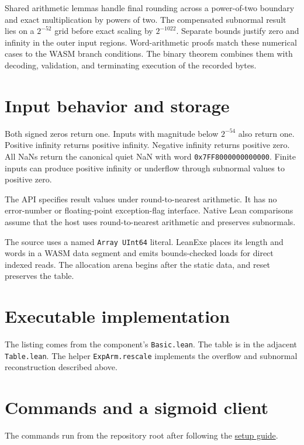Shared arithmetic lemmas handle final rounding across a power-of-two
boundary and exact multiplication by powers of two.  The compensated
subnormal result lies on a $2^{-52}$ grid before exact scaling by
$2^{-1022}$.  Separate bounds justify zero and infinity in the outer input
regions.  Word-arithmetic proofs match these numerical cases to the WASM
branch conditions.  The binary theorem combines them with decoding,
validation, and terminating execution of the recorded bytes.

\section{Input behavior and storage}
Both signed zeros return one.  Inputs with magnitude below $2^{-54}$ also
return one.  Positive infinity returns positive infinity.  Negative infinity
returns positive zero.  All NaNs return the canonical quiet NaN with word
\texttt{0x7FF8000000000000}.  Finite inputs can produce positive infinity
or underflow through subnormal values to positive zero.

The API specifies result values under round-to-nearest arithmetic.  It has
no error-number or floating-point exception-flag interface.  Native Lean
comparisons assume that the host uses round-to-nearest arithmetic and
preserves subnormals.

The source uses a named \texttt{Array UInt64} literal.  LeanExe places its
length and words in a WASM data segment and emits bounds-checked loads for
direct indexed reads.  The allocation arena begins after the static data,
and reset preserves the table.

\newpage
\section{Executable implementation}
The listing comes from the component's \texttt{Basic.lean}.  The table is in
the adjacent \texttt{Table.lean}.  The helper \texttt{ExpArm.rescale} implements
the overflow and subnormal reconstruction described above.



\section{Commands and a sigmoid client}
The commands run from the repository root after following the
\href{https://github.com/jsmorph/leanexe/blob/lib1/DEVELOPING.md}{setup guide}.

